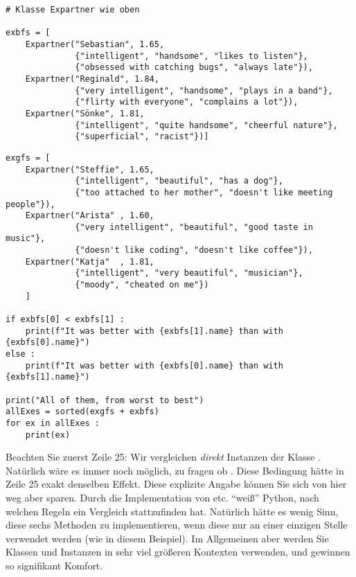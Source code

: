 \begin{codebox}
\begin{verbatim}
# Klasse Expartner wie oben

exbfs = [
    Expartner("Sebastian", 1.65,
              {"intelligent", "handsome", "likes to listen"},
              {"obsessed with catching bugs", "always late"}),
    Expartner("Reginald", 1.84,
              {"very intelligent", "handsome", "plays in a band"},
              {"flirty with everyone", "complains a lot"}),
    Expartner("Sönke", 1.81,
              {"intelligent", "quite handsome", "cheerful nature"},
              {"superficial", "racist"})]
\end{verbatim}
\end{codebox}
%
\begin{codebox}[]
\begin{verbatim}
exgfs = [
    Expartner("Steffie", 1.65, 
              {"intelligent", "beautiful", "has a dog"},
              {"too attached to her mother", "doesn't like meeting people"}),
    Expartner("Arista" , 1.60,
              {"very intelligent", "beautiful", "good taste in music"},
              {"doesn't like coding", "doesn't like coffee"}),
    Expartner("Katja"  , 1.81,
              {"intelligent", "very beautiful", "musician"},
              {"moody", "cheated on me"})
    ]

if exbfs[0] < exbfs[1] :
    print(f"It was better with {exbfs[1].name} than with {exbfs[0].name}")
else :
    print(f"It was better with {exbfs[0].name} than with {exbfs[1].name}")

print("All of them, from worst to best")
allExes = sorted(exgfs + exbfs)
for ex in allExes :
    print(ex)
\end{verbatim}
\end{codebox}

Beachten Sie zuerst Zeile 25: Wir vergleichen \emph{direkt} Instanzen der Klasse . Natürlich wäre es immer noch möglich, zu fragen ob . Diese Bedingung hätte in Zeile 25 exakt denselben Effekt. Diese explizite Angabe können Sie sich von hier weg aber sparen. Durch die Implementation von  etc. \enquote{weiß} Python, nach welchen Regeln ein Vergleich stattzufinden hat. Natürlich hätte es wenig Sinn, diese sechs Methoden zu implementieren, wenn diese nur an einer einzigen Stelle verwendet werden (wie in diesem Beispiel). Im Allgemeinen aber werden Sie Klassen und Instanzen in sehr viel größeren Kontexten verwenden, und gewinnen so signifikant Komfort.

